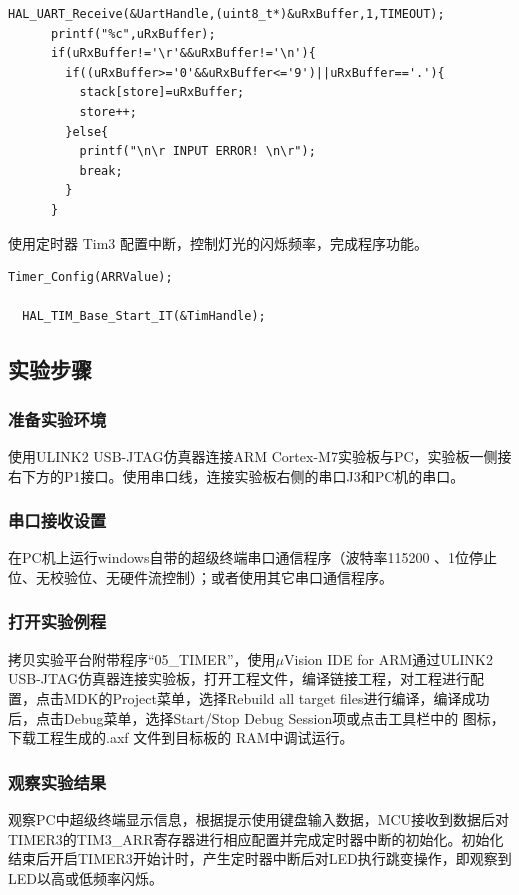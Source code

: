 ﻿\documentclass[UTF8,12pt]{article}
\begin{document}
\begin{lstlisting}[frame=shadowbox]
  HAL_UART_Receive(&UartHandle,(uint8_t*)&uRxBuffer,1,TIMEOUT);
      printf("%c",uRxBuffer);
      if(uRxBuffer!='\r'&&uRxBuffer!='\n'){
        if((uRxBuffer>='0'&&uRxBuffer<='9')||uRxBuffer=='.'){
          stack[store]=uRxBuffer;
          store++;
        }else{
          printf("\n\r INPUT ERROR! \n\r");
          break;
        }
      }
\end{lstlisting}
使用定时器 Tim3 配置中断，控制灯光的闪烁频率，完成程序功能。

\begin{lstlisting}[frame=shadowbox]
  Timer_Config(ARRValue);

  HAL_TIM_Base_Start_IT(&TimHandle);
\end{lstlisting}

\subsection{实验步骤}
\subsubsection{准备实验环境}
使用ULINK2 USB-JTAG仿真器连接ARM Cortex-M7实验板与PC，实验板一侧接右下方的P1接口。使用串口线，连接实验板右侧的串口J3和PC机的串口。

\subsubsection{串口接收设置}
在PC机上运行windows自带的超级终端串口通信程序（波特率115200 、1位停止位、无校验位、无硬件流控制）；或者使用其它串口通信程序。

\subsubsection{打开实验例程}
拷贝实验平台附带程序“05\_TIMER”，使用$\mu$Vision IDE for ARM通过ULINK2 USB-JTAG仿真器连接实验板，打开工程文件，编译链接工程，对工程进行配置，点击MDK的Project菜单，选择Rebuild all target files进行编译，编译成功后，点击Debug菜单，选择Start/Stop Debug Session项或点击工具栏中的 图标，下载工程生成的.axf 文件到目标板的 RAM中调试运行。

\subsubsection{观察实验结果}
观察PC中超级终端显示信息，根据提示使用键盘输入数据，MCU接收到数据后对TIMER3的TIM3\_ARR寄存器进行相应配置并完成定时器中断的初始化。初始化结束后开启TIMER3开始计时，产生定时器中断后对LED执行跳变操作，即观察到LED以高或低频率闪烁。
\end{document}
